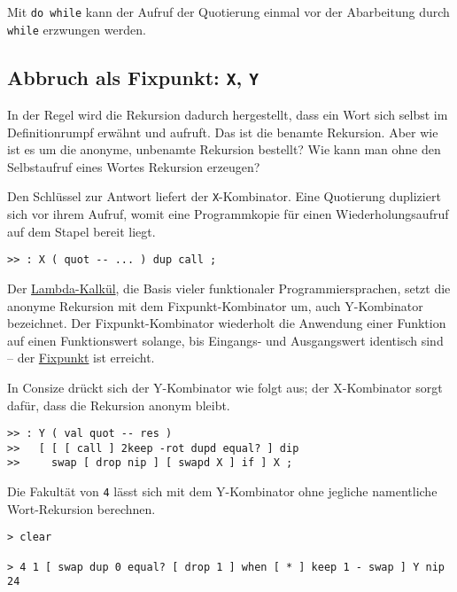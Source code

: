 Mit \verb|do while| kann der Aufruf der Quotierung einmal vor der Abarbeitung durch \verb|while| erzwungen werden.


\subsection{Abbruch als Fixpunkt: \texttt{X}, \texttt{Y}}

In der Regel wird die Rekursion dadurch hergestellt, dass ein Wort sich selbst im Definitionrumpf erwähnt und aufruft. Das ist die benamte Rekursion. Aber wie ist es um die anonyme, unbenamte Rekursion bestellt? Wie kann man ohne den Selbstaufruf eines Wortes Rekursion erzeugen?

Den Schlüssel zur Antwort liefert der \verb|X|-Kombinator. Eine Quotierung dupliziert sich vor ihrem Aufruf, womit eine Programmkopie für einen Wiederholungsaufruf auf dem Stapel bereit liegt.

\begin{verbatim}
>> : X ( quot -- ... ) dup call ;
\end{verbatim}

Der \href{http://de.wikipedia.org/wiki/Lambda-Kalk\%C3\%BCl}{Lambda-Kalkül},
die Basis vieler funktionaler Programmiersprachen, setzt die anonyme Rekursion mit dem Fixpunkt-Kombinator um, auch Y-Kombinator bezeichnet. Der Fixpunkt-Kombinator wiederholt die Anwendung einer Funktion auf einen Funktionswert solange, bis Eingangs- und Ausgangswert identisch sind -- der \href{http://de.wikipedia.org/wiki/Fixpunkt_(Mathematik)}{Fixpunkt} ist erreicht.

In Consize drückt sich der Y-Kombinator wie folgt aus; der X-Kombinator sorgt dafür, dass die Rekursion anonym bleibt.

\begin{verbatim}
>> : Y ( val quot -- res )
>>   [ [ [ call ] 2keep -rot dupd equal? ] dip
>>     swap [ drop nip ] [ swapd X ] if ] X ;
\end{verbatim}

Die Fakultät von \verb|4| lässt sich mit dem Y-Kombinator ohne jegliche namentliche Wort-Rekursion berechnen.

\begin{verbatim}
> clear

> 4 1 [ swap dup 0 equal? [ drop 1 ] when [ * ] keep 1 - swap ] Y nip
24
\end{verbatim}

